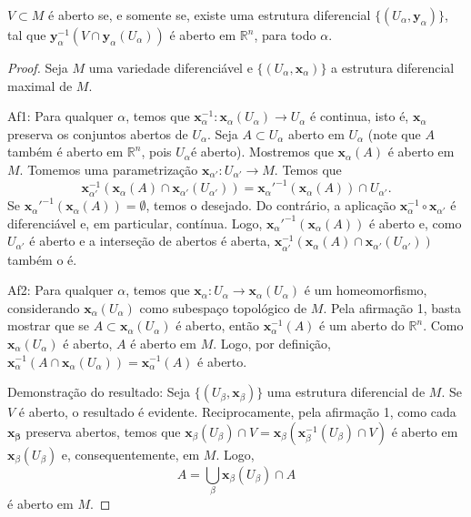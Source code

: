 \begin{proposition}
    \label{loc:!resultados_extras_importantes!.resultado_1}
    $V \subset M$ é aberto se, e somente se, existe uma estrutura diferencial $\{ (U_{\alpha}, \mathbf{y}_{\alpha}) \}$, tal que $\mathbf{y}_{\alpha}^{-1}(V \cap \mathbf{y}_{\alpha}(U_{\alpha}))$ é aberto em $\mathbb{R}^{n}$, para todo $\alpha$.
    \begin{proof}

        Seja $M$ uma variedade diferenciável e $\{ (U_{\alpha}, \mathbf{x}_{\alpha}) \}$ a estrutura diferencial maximal de $M$.

        Af1:  Para qualquer $\alpha$, temos que $\mathbf{x}_{\alpha}^{-1}:\mathbf{x}_{\alpha}(U_{\alpha})\to U_{\alpha}$ é continua, isto é, $\mathbf{x}_{\alpha}$ preserva os conjuntos abertos de $U_{\alpha}$.
        Seja $A \subset U_{\alpha}$ aberto em $U_{\alpha}$ (note que $A$ também é aberto em $\mathbb{R}^{n}$, pois $U_{\alpha}$é aberto). Mostremos que $\mathbf{x}_{\alpha}(A)$ é aberto em $M$. Tomemos uma parametrização $\mathbf{x}_{\alpha'}:U_{\alpha'}\to M$. Temos que
        \begin{equation*}
            \mathbf{x}_{\alpha'}^{-1}(\mathbf{x}_{\alpha}(A)\cap \mathbf{x}_{\alpha'}(U_{\alpha'}))=\mathbf{x}_{\alpha}'^{-1}(\mathbf{x}_{\alpha}(A)) \cap U_{\alpha'}.
        \end{equation*}
        Se $\mathbf{x}_{\alpha}'^{-1}(\mathbf{x}_{\alpha}(A))=\emptyset$, temos o desejado. Do contrário, a aplicação $\mathbf{x}_{\alpha}^{-1} \circ \mathbf{x}_{\alpha'}$ é diferenciável e, em particular, contínua. Logo, $\mathbf{x}_{\alpha}'^{-1}(\mathbf{x}_{\alpha}(A))$ é aberto e, como $U_{\alpha'}$ é aberto e a interseção de abertos é aberta, $\mathbf{x}_{\alpha'}^{-1}(\mathbf{x}_{\alpha}(A)\cap \mathbf{x}_{\alpha'}(U_{\alpha'}))$ também o é.

        Af2: Para qualquer $\alpha$, temos que $\mathbf{x}_{\alpha}:U_{\alpha}\to \mathbf{x}_{\alpha}(U_{\alpha})$ é um homeomorfismo, considerando $\mathbf{x}_{\alpha}(U_{\alpha})$ como subespaço topológico de $M$.
        Pela afirmação 1, basta mostrar que se $A \subset \mathbf{x}_{\alpha}(U_{\alpha})$ é aberto, então $\mathbf{x}_{\alpha}^{-1}(A)$ é um aberto do $\mathbb{R}^{n}$.
        Como $\mathbf{x}_{\alpha}(U_{\alpha})$ é aberto, $A$ é aberto em $M$. Logo, por definição, $\mathbf{x}_{\alpha}^{-1}(A \cap \mathbf{x}_{\alpha}(U_{\alpha}))=\mathbf{x}_{\alpha}^{-1}(A)$ é aberto.

        Demonstração do resultado:
        Seja $\{ (U_{\beta}, \mathbf{x}_{\beta}) \}$ uma estrutura diferencial de $M$.
        Se $V$ é aberto, o resultado é evidente. Reciprocamente, pela afirmação 1, como cada $\mathbf{x_{\beta}}$ preserva abertos, temos que $\mathbf{x}_{\beta}(U_{\beta})\cap V=\mathbf{x}_{\beta}(\mathbf{x}_{\beta}^{-1}(U_{\beta})\cap V)$ é aberto em $\mathbf{x}_{\beta}(U_{\beta})$ e, consequentemente, em $M$.
        Logo,
        \begin{equation*}
            A=\bigcup_{\beta}\mathbf{x}_{\beta}(U_{\beta})\cap A
        \end{equation*}
        é aberto em $M$.
    \end{proof}
\end{proposition}
